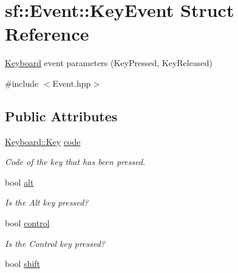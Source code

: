 \hypertarget{structsf_1_1Event_1_1KeyEvent}{\section{sf\-:\-:Event\-:\-:Key\-Event Struct Reference}
\label{structsf_1_1Event_1_1KeyEvent}
}


\hyperlink{classsf_1_1Keyboard}{Keyboard} event parameters (Key\-Pressed, Key\-Released)  




{\ttfamily \#include $<$Event.\-hpp$>$}

\subsection*{Public Attributes}
\begin{DoxyCompactItemize}
\item 
\hypertarget{structsf_1_1Event_1_1KeyEvent_a2879fdab8a68cb1c6ecc45730a2d0e61}{\hyperlink{classsf_1_1Keyboard_acb4cacd7cc5802dec45724cf3314a142}{Keyboard\-::\-Key} \hyperlink{structsf_1_1Event_1_1KeyEvent_a2879fdab8a68cb1c6ecc45730a2d0e61}{code}}\label{structsf_1_1Event_1_1KeyEvent_a2879fdab8a68cb1c6ecc45730a2d0e61}

\begin{DoxyCompactList}\small\item\em Code of the key that has been pressed. \end{DoxyCompactList}\item 
\hypertarget{structsf_1_1Event_1_1KeyEvent_a915a483317de67d995188a855701fbd7}{bool \hyperlink{structsf_1_1Event_1_1KeyEvent_a915a483317de67d995188a855701fbd7}{alt}}\label{structsf_1_1Event_1_1KeyEvent_a915a483317de67d995188a855701fbd7}

\begin{DoxyCompactList}\small\item\em Is the Alt key pressed? \end{DoxyCompactList}\item 
\hypertarget{structsf_1_1Event_1_1KeyEvent_a9255861c2f88501d80ad6b44a310b62f}{bool \hyperlink{structsf_1_1Event_1_1KeyEvent_a9255861c2f88501d80ad6b44a310b62f}{control}}\label{structsf_1_1Event_1_1KeyEvent_a9255861c2f88501d80ad6b44a310b62f}

\begin{DoxyCompactList}\small\item\em Is the Control key pressed? \end{DoxyCompactList}\item 
\hypertarget{structsf_1_1Event_1_1KeyEvent_a776af1a3ca79abeeec18ebf1c0065aa9}{bool \hyperlink{structsf_1_1Event_1_1KeyEvent_a776af1a3ca79abeeec18ebf1c0065aa9}{shift}}\label{structsf_1_1Event_1_1KeyEvent_a776af1a3ca79abeeec18ebf1c0065aa9}


\end{DoxyCompactItemize}
